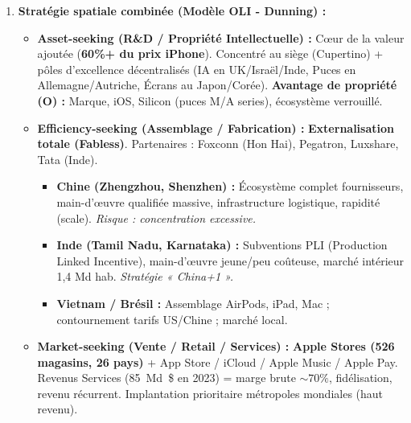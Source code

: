 \documentclass[11pt]{article}
\begin{document}
\begin{exoresolu}
\begin{enumerate}
        \item \textbf{Stratégie spatiale combinée (Modèle OLI - Dunning) :}
            \begin{itemize}
                \item \textbf{Asset-seeking (R\&D / Propriété Intellectuelle) :} Cœur de la valeur ajoutée (\textbf{60\%+ du prix iPhone}). Concentré au siège (Cupertino) + pôles d'excellence décentralisés (IA en UK/Israël/Inde, Puces en Allemagne/Autriche, Écrans au Japon/Corée). \textbf{Avantage de propriété (O) :} Marque, iOS, Silicon (puces M/A series), écosystème verrouillé.
                \item \textbf{Efficiency-seeking (Assemblage / Fabrication) :} \textbf{Externalisation totale (Fabless)}. Partenaires : Foxconn (Hon Hai), Pegatron, Luxshare, Tata (Inde).
                    \begin{itemize}
                        \item \textbf{Chine (Zhengzhou, Shenzhen) :} Écosystème complet fournisseurs, main-d'œuvre qualifiée massive, infrastructure logistique, rapidité (scale). \emph{Risque : concentration excessive.}
                        \item \textbf{Inde (Tamil Nadu, Karnataka) :} Subventions PLI (Production Linked Incentive), main-d'œuvre jeune/peu coûteuse, marché intérieur 1,4 Md hab. \emph{Stratégie « China+1 ».}
                        \item \textbf{Vietnam / Brésil :} Assemblage AirPods, iPad, Mac ; contournement tarifs US/Chine ; marché local.
                    \end{itemize}
                \item \textbf{Market-seeking (Vente / Retail / Services) :} \textbf{Apple Stores (526 magasins, 26 pays)} + App Store / iCloud / Apple Music / Apple Pay. Revenus Services (\SI{85}{Md\$} en 2023) = marge brute $\sim 70\%$, fidélisation, revenu récurrent. Implantation prioritaire métropoles mondiales (haut revenu).
            \end{itemize}
        

\end{enumerate}
\end{exoresolu}
\end{document}
